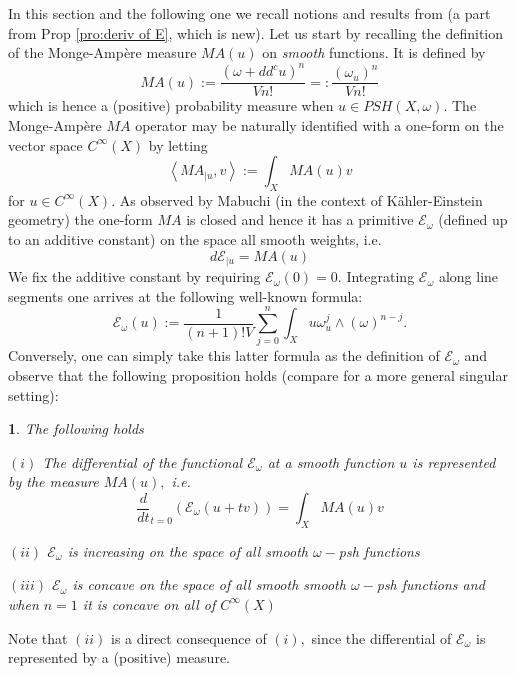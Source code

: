 \documentclass[11pt,oneside,english]{amsart}
\numberwithin{equation}{section}
\numberwithin{figure}{section}
\theoremstyle{plain}
\theoremstyle{plain}
\theoremstyle{plain}
\theoremstyle{plain}
\newtheorem{prop}[thm]{\protect\propositionname}
\theoremstyle{remark}
\theoremstyle{definition}
\providecommand{\propositionname}{Proposition}
\begin{document}
In this section and the following one we recall notions and results
from \cite{g-z2,begz,bbgz} (a part from Prop \ref{pro:deriv of E},
which is new). Let us start by recalling the definition of the Monge-Ampère
measure $MA(u)$ on\emph{ smooth} functions. It is defined by 
\[
MA(u):=\frac{(\omega+dd^{c}u)^{n}}{Vn!}=:\frac{(\omega_{u})^{n}}{Vn!}
\]
 which is hence a (positive) probability measure when $u\in PSH(X,\omega).$
The Monge-Ampère $MA$ operator may be naturally identified with a
one-form on the vector space $C^{\infty}(X)$ by letting 
\[
\left\langle MA_{|u},v\right\rangle :=\int_{X}MA(u)v
\]
 for $u\in C^{\infty}(X).$ As observed by Mabuchi \cite{m2,m1} (in
the context of Kähler-Einstein geometry) the one-form $MA$ is closed
and hence it has a primitive $\mathcal{E}_{\omega}$ (defined up to
an additive constant) on the space all smooth weights, i.e. 
\begin{equation}
d\mathcal{E}_{|u}=MA(u)\label{eq:def prop of energy on psh}
\end{equation}
 We fix the additive constant by requiring $\mathcal{E}_{\omega}(0)=0.$
Integrating $\mathcal{E}_{\omega}$ along line segments one arrives
at the following well-known formula:
\begin{equation}
\mathcal{E}_{\omega}(u):=\frac{1}{(n+1)!V}\sum_{j=0}^{n}\int_{X}u\omega_{u}^{j}\wedge(\omega)^{n-j}.\label{eq:bi-energy}
\end{equation}
Conversely, one can simply take this latter formula as the definition
of $\mathcal{E}_{\omega}$ and observe that the following proposition
holds (compare \cite{b-b} for a more general singular setting): 
\begin{prop}
\label{pro:of energy}The following holds

$(i)$ The differential of the functional $\mathcal{E}_{\omega}$
at a smooth function $u$ is represented by the measure $MA(u),$
i.e. 
\begin{equation}
\frac{d}{dt}_{t=0}(\mathcal{E}_{\omega}(u+tv))=\int_{X}MA(u)v\label{eq:diff}
\end{equation}

$(ii)$ $\mathcal{E}_{\omega}$ is increasing on the space of all
smooth $\omega-$psh functions

$(iii)$ $\mathcal{E}_{\omega}$ is concave on the space of all smooth
smooth $\omega-$psh functions and when $n=1$ it is concave on all
of $C^{\infty}(X)$ 
\end{prop}
Note that $(ii)$ is a direct consequence of $(i),$ since the differential
of $\mathcal{E}_{\omega}$ is represented by a (positive) measure.
\end{document}
